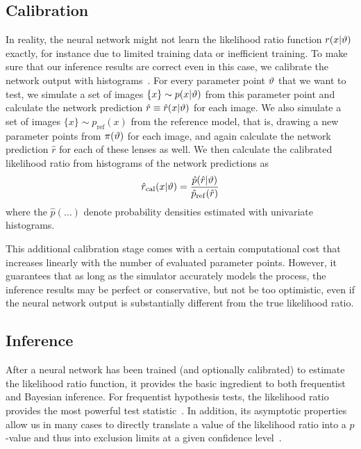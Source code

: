 \documentclass[twocolumn]{aastex62}
\begin{document}
\subsection{Calibration}
\label{sec:lfi-calibration}

In reality, the neural network might not learn the likelihood ratio function $r(x|\vartheta)$ exactly, for instance due to limited training data or inefficient training. To make sure that our inference results are correct even in this case, we calibrate the network output with histograms~\citep{Cranmer:2015bka, 1805.00020}. For every parameter point $\vartheta$ that we want to test, we simulate a set of images $\{x\} \sim p(x|\vartheta)$ from this parameter point and calculate the network prediction $\hat{r} \equiv \hat{r}(x|\vartheta)$ for each image. We also simulate a set of images $\{x\} \sim p_{\mathrm{ref}}(x)$ from the reference model, that is, drawing a new parameter points from $\pi(\vartheta)$ for each image, and again calculate the network prediction $\hat{r}$ for each of these lenses as well. We then calculate the calibrated likelihood ratio from histograms of the network predictions as
%
\begin{equation}
  \hat{r}_\mathrm{cal}(x|\stattheta)
  = \frac {\hat{p}( \hat{r} | \stattheta )} {\hat{p}_\mathrm{ref}(\hat{r})}
\end{equation}
%
where the $\hat{p}(\dots)$ denote probability densities estimated with univariate histograms.

This additional calibration stage comes with a certain computational cost that increases linearly with the number of evaluated parameter points. However, it guarantees that as long as the simulator accurately models the process, the inference results may be perfect or conservative, but not be too optimistic, even if the neural network output is substantially different from the true likelihood ratio.


\subsection{Inference}
\label{sec:lfi-inference}

After a neural network has been trained (and optionally calibrated) to estimate the likelihood ratio function, it provides the basic ingredient to both frequentist and Bayesian inference. For frequentist hypothesis tests, the likelihood ratio provides the most powerful test statistic~\citep{1933RSPTA.231..289N}. In addition, its asymptotic properties allow us in many cases to directly translate a value of the likelihood ratio into a $p$-value and thus into exclusion limits at a given confidence level~\citep{Wilks:1938dza, Wald, Cowan:2010js}.
\end{document}
